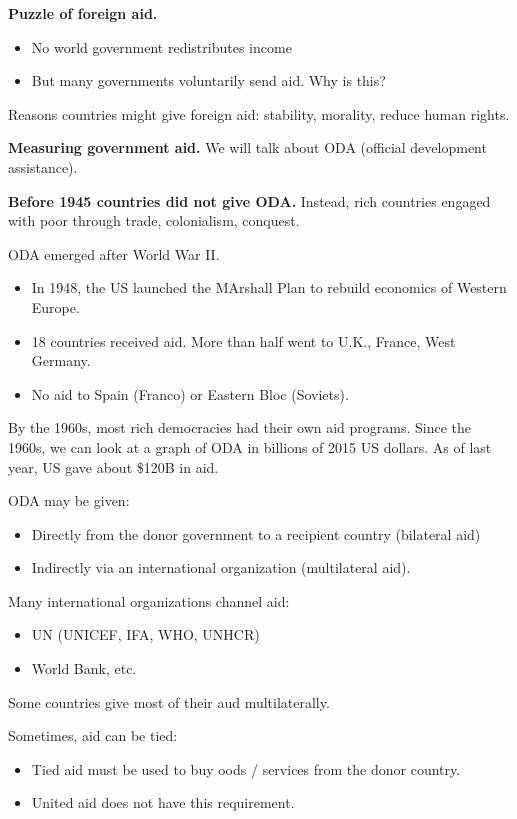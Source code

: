 \documentclass{article}
\begin{document}
{\bf Puzzle of foreign aid.}
\begin{itemize}
  \item No world government redistributes income
  \item But many governments voluntarily send aid.  Why is this?
\end{itemize}

Reasons countries might give foreign aid: stability, morality, reduce human rights.

{\bf Measuring government aid.} We will talk about ODA (official development assistance).

{\bf Before 1945 countries did not give ODA.}  Instead, rich countries engaged with poor through trade, colonialism, conquest.

ODA emerged after World War II.

\begin{itemize}
  \item In 1948, the US launched the MArshall Plan to rebuild economics of Western Europe.
  \item 18 countries received aid.  More than half went to U.K., France, West Germany.
  \item No aid to Spain (Franco) or Eastern Bloc (Soviets).
\end{itemize}

By the 1960s, most rich democracies had their own aid programs.  Since the 1960s, we can look at a graph of ODA in billions of 2015 US dollars.  As of last year, US gave about \$120B in aid.

ODA may be given:
\begin{itemize}
  \item Directly from the donor government to a recipient country (bilateral aid)
  \item Indirectly via an international organization (multilateral aid).
\end{itemize}

Many international organizations channel aid:

\begin{itemize}
  \item UN (UNICEF, IFA, WHO, UNHCR)
  \item World Bank, etc.
\end{itemize}

Some countries give most of their aud multilaterally.

Sometimes, aid can be tied:

\begin{itemize}
  \item Tied aid must be used to buy oods / services from the donor country.
  \item United aid does not have this requirement.
\end{itemize}
\end{document}
